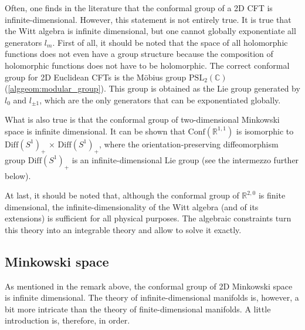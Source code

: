     \begin{remark}
        Often, one finds in the literature that the conformal group of a 2D CFT is infinite-dimensional. However, this statement is not entirely true. It is true that the Witt algebra is infinite dimensional, but one cannot globally exponentiate all generators $l_m$. First of all, it should be noted that the space of all holomorphic functions does not even have a group structure because the composition of holomorphic functions does not have to be holomorphic. The correct conformal group for 2D Euclidean CFTs is the M\"obius group $\mathrm{PSL}_2(\mathbb{C})$ (\cref{alggeom:modular_group}). This group is obtained as the Lie group generated by $l_0$ and $l_{\pm1}$, which are the only generators that can be exponentiated globally.

        What is also true is that the conformal group of two-dimensional Minkowski space is infinite dimensional. It can be shown that $\mathrm{Conf}(\mathbb{R}^{1,1})$ is isomorphic to $\mathrm{Diff}(S^1)_+\,\times\,\mathrm{Diff}(S^1)_+$, where the orientation-preserving diffeomorphism group $\mathrm{Diff}(S^1)_+$ is an infinite-dimensional Lie group (see the intermezzo further below).

        At last, it should be noted that, although the conformal group of $\mathbb{R}^{2,0}$ is finite dimensional, the infinite-dimensionality of the Witt algebra (and of its extensions) is sufficient for all physical purposes. The algebraic constraints turn this theory into an integrable theory and allow to solve it exactly.
    \end{remark}


\subsection{Minkowski space}

    As mentioned in the remark above, the conformal group of 2D Minkowski space is infinite dimensional. The theory of infinite-dimensional manifolds is, however, a bit more intricate than the theory of finite-dimensional manifolds. A little introduction is, therefore, in order.

